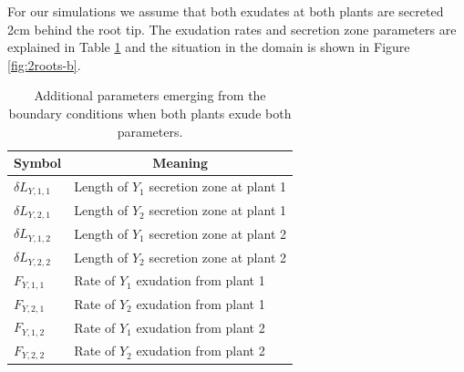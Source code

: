 \documentclass[11pt]{article}
\numberwithin{equation}{section}
\begin{document}
For our simulations we assume that both exudates at both plants are secreted 2cm behind the root tip. The exudation rates and secretion zone parameters are explained in Table \ref{t:Boundary-additional-parameters} and the situation in the domain is shown in Figure \ref{fig:2roots-b}.

	
\begin{table}[!htb]
\begin{center}
\fontsize{9.5}{7}\selectfont
\setlength{\tabcolsep}{5.pt}
\def\arraystretch{1.5}
\begin{tabular}{ll}
\toprule
    \bf Symbol & \multicolumn{1}{c}{\bf Meaning}
    \\ \midrule
	$\delta L_{Y,1,1}$ & Length of $Y_1$ secretion zone at plant 1  \\
	$\delta L_{Y,2,1}$ & Length of $Y_2$ secretion zone at plant 1  \\
	$\delta L_{Y,1,2}$ &  Length of $Y_1$ secretion zone at plant 2 \\
	$\delta L_{Y,2,2}$ &  Length of $Y_2$ secretion zone at plant 2 \\
    $F_{Y,1,1} $ & Rate of $Y_1$ exudation from plant 1 \\
	$F_{Y,2,1} $ & Rate of $Y_2$ exudation from plant 1 \\
	$F_{Y,1,2} $ & Rate of $Y_1$ exudation from plant 2 \\
	$F_{Y,2,2} $ & Rate of $Y_2$ exudation from plant 2 \\
\bottomrule
\end{tabular}
\caption{Additional parameters emerging from the boundary conditions when both plants exude both parameters.
\label{t:Boundary-additional-parameters}}
\end{center}
\end{table}
\end{document}
